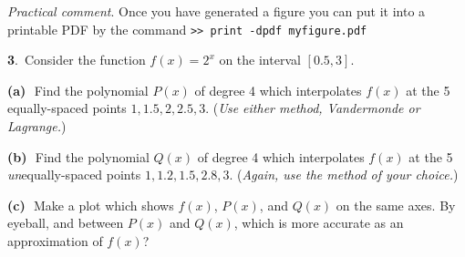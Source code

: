 \documentclass[12pt]{amsart}
\newcommand{\prob}[1]{\bigskip\noindent\large\textbf{#1}.\,\normalsize }
\newcommand{\epart}[1]{\medskip\noindent\textbf{(#1)}\,\, }
\begin{document}
\medskip
\noindent \emph{Practical comment}.  Once you have generated a figure you can put it into a printable PDF by the command \quad \texttt{>> print -dpdf myfigure.pdf}


\prob{3}  Consider the function $f(x) = 2^x$ on the interval $[0.5,3]$.

\epart{a} Find the polynomial $P(x)$ of degree 4 which interpolates $f(x)$ at the 5 equally-spaced points $1,1.5,2,2.5,3$.  (\emph{Use either method, Vandermonde or Lagrange.})

\epart{b} Find the polynomial $Q(x)$ of degree 4 which interpolates $f(x)$ at the 5 \emph{un}equally-spaced points $1,1.2,1.5,2.8,3$.  (\emph{Again, use the method of your choice.})

\epart{c} Make a plot which shows $f(x)$, $P(x)$, and $Q(x)$ on the same axes.  By eyeball, and between $P(x)$ and $Q(x)$, which is more accurate as an approximation of $f(x)$?
\end{document}
